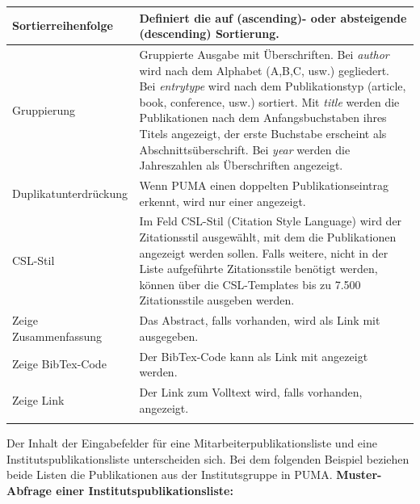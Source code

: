 \begin{longtabu}{|X|p{7cm}|}
Sortierreihenfolge &	Definiert die auf (ascending)- oder absteigende (descending) Sortierung.\\ \hline 
Gruppierung &	Gruppierte Ausgabe mit Überschriften. Bei \textit{author} wird nach dem Alphabet (A,B,C, usw.) gegliedert. Bei \textit{entrytype} wird nach dem Publikationstyp (article, book, conference, usw.) sortiert. Mit \textit{title} werden die Publikationen nach dem Anfangsbuchstaben ihres Titels angezeigt, der erste Buchstabe erscheint als Abschnittsüberschrift. Bei \textit{year} werden die Jahreszahlen als Überschriften angezeigt.\\ \hline
Duplikatunterdrückung &	Wenn PUMA einen doppelten Publikationseintrag erkennt, wird nur einer angezeigt.\\ \hline
CSL-Stil &	Im Feld CSL-Stil (Citation Style Language) wird der Zitationsstil ausgewählt, mit dem die Publikationen angezeigt werden sollen. Falls weitere, nicht in der Liste aufgeführte Zitationsstile benötigt werden, können über die CSL-Templates bis zu 7.500 Zitationsstile ausgeben werden.\\ \hline
Zeige Zusammenfassung& 	Das Abstract, falls vorhanden, wird als Link mit ausgegeben.\\ \hline
Zeige BibTex-Code &	Der BibTex-Code kann als Link mit angezeigt werden.\\ \hline
Zeige Link & Der Link zum Volltext wird, falls vorhanden, angezeigt.\\ \hline
\label{tab:eingabefelder}
\end{longtabu}
Der Inhalt der Eingabefelder für eine Mitarbeiterpublikationsliste und eine Institutspublikationsliste unterscheiden sich. Bei dem folgenden Beispiel beziehen beide Listen die Publikationen aus der Institutsgruppe in PUMA.\newline\newline
\textbf{Muster-Abfrage einer Institutspublikationsliste:}
